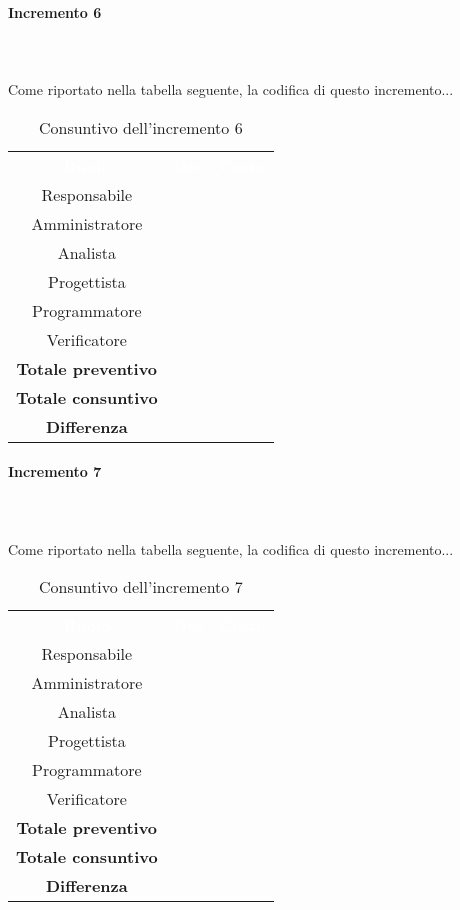 \paragraph*{Incremento 6} \mbox{} \\ \mbox{} \\
Come riportato nella tabella seguente, la codifica di questo incremento...
\begin{table}[H]
\centering\renewcommand{\arraystretch}{1.5}
\caption{Consuntivo dell'incremento 6}
\vspace{0.2cm}
\begin{tabular}{ c c c }
\rowcolor{redafk}
\textcolor{white}{\textbf{Ruolo}} & \textcolor{white}{\textbf{Ore}} &
\textcolor{white}{\textbf{Costo}}  \\
Responsabile 	&  &  \\
Amministratore 	&  	&  \\
Analista 		&   &  \\
Progettista		&   & \\
Programmatore	&  	& \\
Verificatore 	&  &  \\
\textbf{Totale preventivo} & &   \\
\textbf{Totale consuntivo} &  &   \\
\rowcolor{lastrowcolor}
\textbf{Differenza} & &  \\
\end{tabular}
\end{table}

\paragraph*{Incremento 7} \mbox{} \\ \mbox{} \\
Come riportato nella tabella seguente, la codifica di questo incremento...
\begin{table}[H]
\centering\renewcommand{\arraystretch}{1.5}
\caption{Consuntivo dell'incremento 7}
\vspace{0.2cm}
\begin{tabular}{ c c c }
\rowcolor{redafk}
\textcolor{white}{\textbf{Ruolo}} & \textcolor{white}{\textbf{Ore}} &
\textcolor{white}{\textbf{Costo}}  \\
Responsabile 	&  &  \\
Amministratore 	&  	&  \\
Analista 		&   &  \\
Progettista		&   & \\
Programmatore	&  	& \\
Verificatore 	&  &  \\
\textbf{Totale preventivo} & &   \\
\textbf{Totale consuntivo} &  &   \\
\rowcolor{lastrowcolor}
\textbf{Differenza} & &  \\
\end{tabular}
\end{table}

